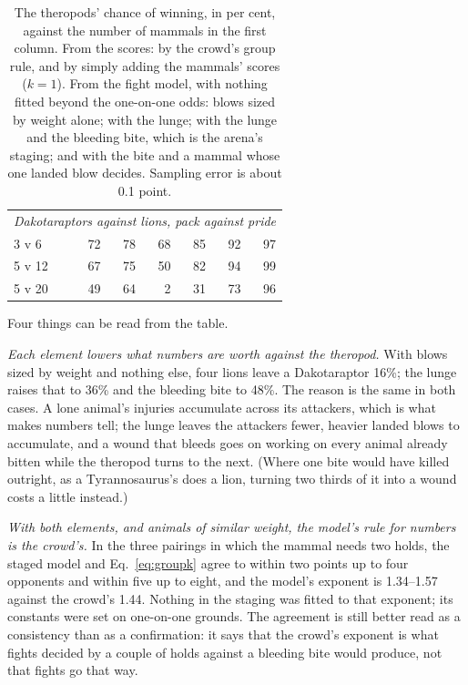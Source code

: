 \documentclass[11pt]{article}
\begin{document}
\begin{table}[t]
\begin{tabular}{lrrrrrr}
\multicolumn{7}{l}{\textit{Dakotaraptors against lions, pack against pride}} \\
3 v 6 & 72 & 78 & 68 & 85 & 92 & 97 \\
5 v 12 & 67 & 75 & 50 & 82 & 94 & 99 \\
5 v 20 & 49 & 64 & 2 & 31 & 73 & 96 \\
\bottomrule
\end{tabular}
\caption{The theropods' chance of winning, in per cent, against the number of mammals in the first column. From the scores: by the crowd's group rule, and by simply adding the mammals' scores ($k=1$). From the fight model, with nothing fitted beyond the one-on-one odds: blows sized by weight alone; with the lunge; with the lunge and the bleeding bite, which is the arena's staging; and with the bite and a mammal whose one landed blow decides. Sampling error is about 0.1 point.}
\label{tab:groups}
\end{table}

Four things can be read from the table.

\emph{Each element lowers what numbers are worth against the theropod.} With blows sized by weight and nothing else, four lions leave a Dakotaraptor 16\%; the lunge raises that to 36\% and the bleeding bite to 48\%. The reason is the same in both cases. A lone animal's injuries accumulate across its attackers, which is what makes numbers tell; the lunge leaves the attackers fewer, heavier landed blows to accumulate, and a wound that bleeds goes on working on every animal already bitten while the theropod turns to the next. (Where one bite would have killed outright, as a Tyrannosaurus's does a lion, turning two thirds of it into a wound costs a little instead.)

\emph{With both elements, and animals of similar weight, the model's rule for numbers is the crowd's.} In the three pairings in which the mammal needs two holds, the staged model and Eq.~\eqref{eq:groupk} agree to within two points up to four opponents and within five up to eight, and the model's exponent is 1.34--1.57 against the crowd's 1.44. Nothing in the staging was fitted to that exponent; its constants were set on one-on-one grounds. The agreement is still better read as a consistency than as a confirmation: it says that the crowd's exponent is what fights decided by a couple of holds against a bleeding bite would produce, not that fights go that way.
\end{document}
